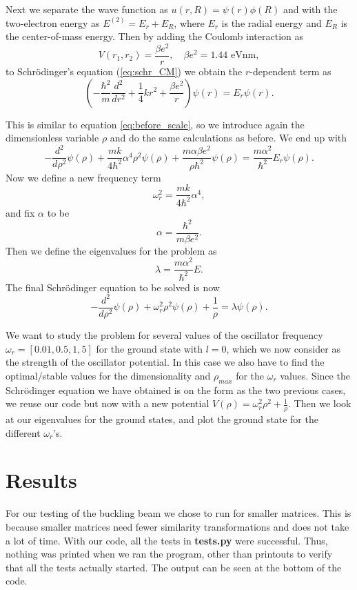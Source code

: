 \documentclass[12pt,a4paper,english]{article}
\begin{document}
Next we separate the wave function as $u(r,R)=\psi(r)\phi(R)$ and with the two-electron energy as $E^{(2)}=E_r+E_R$, where $E_r$ is the radial energy and $E_R$ is the center-of-mass energy. Then by adding the Coulomb interaction as 
\[V(r_1,r_2)=\frac{\beta e^2}{r},\quad \beta e^2=1.44 \text{ eVnm},\]
to Schrödinger's equation (\ref{eq:schr_CM}) we obtain the $r$-dependent term as
\begin{equation}
\label{eq:shcr_split_2}
\left(-\frac{\hbar^2}{m}\frac{d^2}{dr^2}+\frac{1}{4}kr^2+\frac{\beta e^2}{r}\right)\psi(r)=E_r\psi(r).
\end{equation}

This is similar to equation \ref{eq:before_scale}, so we introduce again the dimensionless variable $\rho$ and do the same calculations as before. We end up with 
\begin{equation}
\label{eq:before_alpha_2}
-\frac{d^2}{d\rho^2}\psi(\rho)+\frac{mk}{4\hbar^2}\alpha^4\rho^2\psi(\rho)+\frac{m\alpha\beta e^2}{\rho\hbar^2}\psi(\rho)=\frac{m\alpha^2}{\hbar^2}E_r\psi(\rho).
\end{equation}
Now we define a new frequency term
\[\omega_r^2=\frac{mk}{4\hbar^2}\alpha^4,\]
and fix $\alpha$ to be
\[\alpha=\frac{\hbar^2}{m\beta e^2}.\]
Then we define the eigenvalues for the problem as 
\begin{equation}
\label{eq:eigenval_2}
\lambda=\frac{m\alpha^2}{\hbar^2}E.
\end{equation}
The final Schrödinger equation to be solved is now
\begin{equation}
\label{eq:final_schr_2}
-\frac{d^2}{d\rho^2}\psi(\rho)+\omega_r^2\rho^2\psi(\rho)+\frac{1}{\rho}=\lambda\psi(\rho).
\end{equation}

We want to study the problem for several values of the oscillator frequency\\ $\omega_r=[0.01, 0.5, 1, 5]$ for the ground state with $l=0$, which we now consider as the strength of the oscillator potential. In this case we also have to find the optimal/stable values for the dimensionality and $\rho_{max}$ for the $\omega_r$ values. Since the Schrödinger equation we have obtained is on the form as the two previous cases, we reuse our code but now with a new potential $V(\rho)=\omega_r^2\rho^2+\frac{1}{\rho}$. Then we look at our eigenvalues for the ground states, and plot the ground state for the different $\omega_r$'s.

\section{Results}
For our testing of the buckling beam we chose to run for smaller matrices. This is because smaller matrices need fewer similarity transformations and does not take a lot of time. With our code, all the tests in \textbf{tests.py} were successful. Thus, nothing was printed when we ran the program, other than printouts to verify that all the tests actually started. The output can be seen at the bottom of the code.
\end{document}
